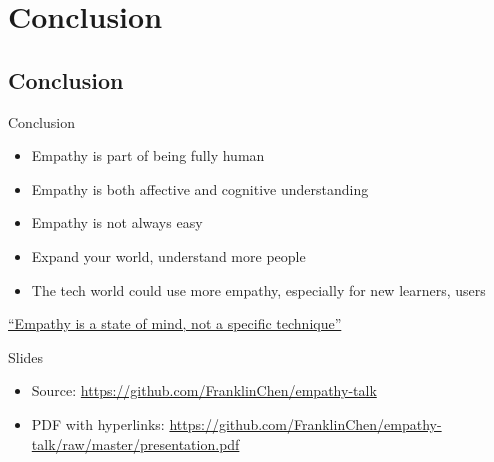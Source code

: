 \section{Conclusion}

\subsection{Conclusion}

\begin{frame}{Conclusion}
  \begin{itemize}
    \item Empathy is part of being fully human
    \item Empathy is both affective and cognitive understanding
    \item Empathy is not always easy
    \item Expand your world, understand more people
    \item The tech world could use more empathy, especially for new
      learners, users
  \end{itemize}

  \href{http://radar.oreilly.com/2015/03/empathy-is-a-state-of-mind-not-a-specific-technique.html}{``Empathy
    is a state of mind, not a specific technique''}
\end{frame}


\begin{frame}{Slides}
  \begin{itemize}
  \item Source: \url{https://github.com/FranklinChen/empathy-talk}
  \item PDF with hyperlinks: \url{https://github.com/FranklinChen/empathy-talk/raw/master/presentation.pdf}
  \end{itemize}
\end{frame}




